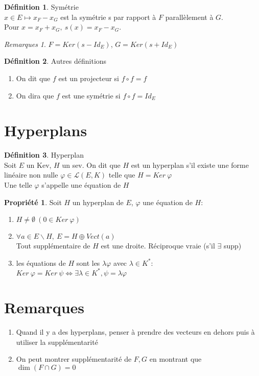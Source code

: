 \documentclass[fleqn]{article}
\theoremstyle{definition} \newtheorem*{defi}{D\'efinition}
\theoremstyle{definition} \newtheorem*{theo}{Th\'eor\`eme}
\theoremstyle{definition} \newtheorem*{coro}{Corollaire}
\theoremstyle{definition} \newtheorem*{nota}{Notation}
\theoremstyle{remark} \newtheorem*{rqs}{Remarques}
\theoremstyle{definition} \newtheorem*{prop}{Propri\'et\'e}
\begin{document}
\begin{defi} Sym\'etrie \\
	$x \in E \mapsto x_F - x_G$ est la sym\'etrie s par rapport \`a $F$ parall\`element \`a $G$. \\Pour $x = x_F + x_G,\ s(x) = x_F  - x_G$.

	\begin{rqs}
			$F = Ker (s - Id_E)$, $G = Ker (s + Id_E)$
	\end{rqs}
\end{defi}

\begin{defi} Autres d\'efinitions
	\begin{enumerate}
		\item On dit que $f$ est un projecteur si $f \circ f = f$
		\item On dira que $f$ est une sym\'etrie si $f \circ f = Id_E$
	\end{enumerate}
\end{defi}

\section{Hyperplans}
\begin{defi} Hyperplan \\
	Soit $E$ un Kev, $H$ un sev. On dit que $H$ est un hyperplan s'il existe une forme lin\'eaire non nulle $\varphi \in \mathscr{L}(E,K)$ telle
	que $H = Ker\ \varphi$ \\
	Une telle $\varphi$ s'appelle une \'equation de $H$
\end{defi}

\begin{prop} Soit $H$ un hyperplan de $E$, $\varphi$ une \'equation de $H$:
	\begin{enumerate}
		\item $H \neq \emptyset\ (0 \in Ker\ \varphi)$
		\item $\forall a \in E \backslash H,\ E = H \oplus Vect(a)$ \\
			Tout suppl\'ementaire de $H$ est une droite. R\'eciproque vraie (s'il $\exists$ supp)
		\item les \'equations de $H$ sont les $\lambda \varphi$ avec $\lambda \in K^*$: \\
			$Ker\ \varphi = Ker\ \psi \Leftrightarrow \exists \lambda \in K^*, \psi = \lambda \varphi$
	\end{enumerate}
\end{prop}

\section{Remarques}
\begin{enumerate}
	\item Quand il y a des hyperplans, penser \`a prendre des vecteurs en dehors puis \`a utiliser la suppl\'ementarit\'e
	\item On peut montrer suppl\'ementarit\'e de $F,G$ en montrant que $\dim (F\cap G) = 0$
\end{enumerate}
\end{document}
